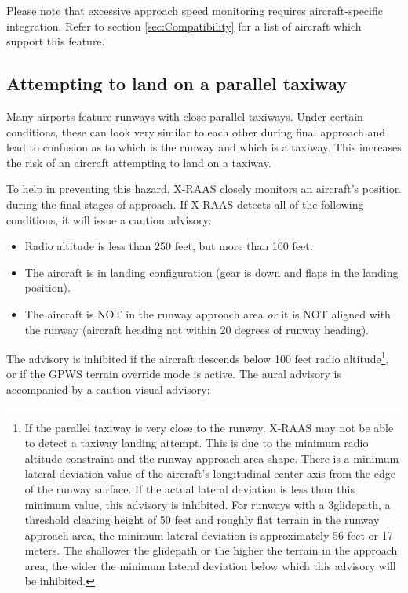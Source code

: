 \documentclass[a4paper,12pt]{article}
\begin{document}
\noindent Please note that excessive approach speed monitoring requires
aircraft-specific integration. Refer to section
\ref{sec:Compatibility} for a list of aircraft which support
this feature.

\subsection{Attempting to land on a parallel taxiway}
\label{subsec:TwyLandingMon}

Many airports feature runways with close parallel taxiways. Under certain
conditions, these can look very similar to each other during final
approach and lead to confusion as to which is the runway and which is a
taxiway. This increases the risk of an aircraft attempting to land on a
taxiway.

To help in preventing this hazard, X-RAAS closely monitors an aircraft's
position during the final stages of approach. If X-RAAS detects all of
the following conditions, it will issue a caution advisory:

\begin{itemize}

\item Radio altitude is less than 250 feet, but more than 100 feet.

\item The aircraft is in landing configuration (gear is down and flaps in
the landing position).

\item The aircraft is NOT in the runway approach area \emph{or} it is NOT
aligned with the runway (aircraft heading not within 20 degrees of runway
heading).

\end{itemize}

\noindent The advisory is inhibited if the aircraft descends below 100
feet radio altitude\footnote{If the parallel taxiway is very close to the
runway, X-RAAS may not be able to detect a taxiway landing attempt. This
is due to the minimum radio altitude constraint and the runway approach
area shape. There is a minimum lateral deviation value of the aircraft's
longitudinal center axis from the edge of the runway surface. If the
actual lateral deviation is less than this minimum value, this advisory
is inhibited. For runways with a 3\degree glidepath, a threshold clearing
height of 50 feet and roughly flat terrain in the runway approach area,
the minimum lateral deviation is approximately 56 feet or 17 meters. The
shallower the glidepath or the higher the terrain in the approach area,
the wider the minimum lateral deviation below which this advisory will be
inhibited.}, or if the GPWS terrain override mode is active. The aural
advisory is accompanied by a caution visual advisory:
\end{document}
